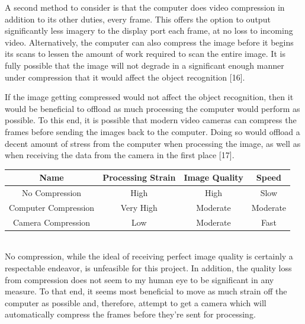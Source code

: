 \documentclass[onecolumn, draftclsnofoot,10pt, compsoc]{IEEEtran}
\begin{document}
A second method to consider is that the computer does video compression in addition to its other duties, every frame.  This offers the option to output significantly less imagery to the display port each frame, at no loss to incoming video.  Alternatively, the computer can also compress the image before it begins its scans to lessen the amount of work required to scan the entire image.  It is fully possible that the image will not degrade in a significant enough manner under compression that it would affect the object recognition [16].

If the image getting compressed would not affect the object recognition, then it would be beneficial to offload as much processing the computer would perform as possible.  To this end, it is possible that modern video cameras can compress the frames before sending the images back to the computer.  Doing so would offload a decent amount of stress from the computer when processing the image, as well as when receiving the data from the camera in the first place [17].

\begin{tabular}{|c|c|c|c|}
  \hline
  \textbf{Name} & \textbf{Processing Strain} & \textbf{Image Quality} & \textbf{Speed} \\
  \hline
  No Compression & High & High & Slow \\ 
  \hline
  Computer Compression & Very High & Moderate & Moderate  \\ 
  \hline
  Camera Compression & Low & Moderate & Fast \\ 
  \hline
\end{tabular} \\

No compression, while the ideal of receiving perfect image quality is certainly a respectable endeavor, is unfeasible for this project.  In addition, the quality loss from compression does not seem to my human eye to be significant in any measure.  To that end, it seems most beneficial to move as much strain off the computer as possible and, therefore, attempt to get a camera which will automatically compress the frames before they're sent for processing.
\end{document}
